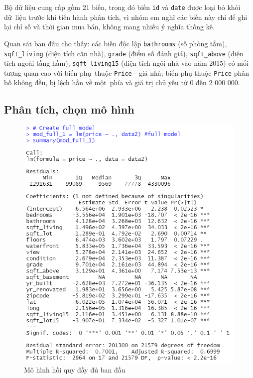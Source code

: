 Bộ dữ liệu cung cấp gồm 21 biến, trong đó biến \texttt{id} và \texttt{date} được loại bỏ khỏi dữ~liệu trước khi tiến hành phân tích, vì nhóm em nghĩ các biến này chỉ để ghi lại chỉ số và thời gian mua bán, không mang nhiều ý nghĩa thống kê. 

Quan sát ban đầu cho thấy: các biến độc lập \texttt{bathrooms} (số phòng tắm), \texttt{sqft\_living} (diện tích căn nhà), \texttt{grade} (điểm số đánh giá), \texttt{sqft\_above} (diện tích ngoài tầng hầm), \texttt{sqft\_living15} (diện tích ngôi nhà vào năm 2015) có mối tương quan cao với biến phụ~thuộc \texttt{Price} - giá nhà; biến phụ thuộc \texttt{Price} phân bố không đều, bị lệch hẳn về một~phía và giá trị chủ yếu từ 0 đến 2 000 000.
\subsection*{Phân tích, chọn mô hình}

\begin{figure}[H]
	\centering
	\includegraphics[width=.7\linewidth]{../Photo Of Result/B2_originalmodel_R}
	\caption{Mô hình hồi quy đầy đủ ban đầu}
	\label{B2_full}
\end{figure}

